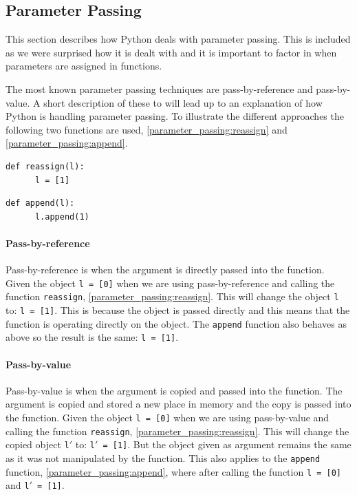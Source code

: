 \subsection{Parameter Passing}
This section describes how Python deals with parameter passing.
This is included as we were surprised how it is dealt with and it is important to factor in when parameters are assigned in functions.

The most known parameter passing techniques are pass-by-reference and pass-by-value.
A short description of these to will lead up to an explanation of how Python is handling parameter passing.
To illustrate the different approaches the following two functions are used, \cref{parameter_passing:reassign} and \cref{parameter_passing:append}.

\begin{lstlisting}[style=python, caption={Parameter passing: \texttt{reassign} function.}, label={parameter_passing:reassign}]
  def reassign(l):
      l = [1]
\end{lstlisting}

\begin{lstlisting}[style=python, caption={Parameter passing: \texttt{append} function.}, label={parameter_passing:append}]
  def append(l):
      l.append(1)
\end{lstlisting}

\paragraph{Pass-by-reference}
Pass-by-reference is when the argument is directly passed into the function.
Given the object \texttt{l = [0]} when we are using pass-by-reference and calling the function \texttt{reassign}, \cref{parameter_passing:reassign}.
This will change the object \texttt{l} to: \texttt{l = [1]}.
This is because the object is passed directly and this means that the function is operating directly on the object.
The \texttt{append} function also behaves as above so the result is the same: \texttt{l = [1]}.

\paragraph{Pass-by-value}
Pass-by-value is when the argument is copied and passed into the function.
The argument is copied and stored a new place in memory and the copy is passed into the function.
Given the object \texttt{l = [0]} when we are using pass-by-value and calling the function \texttt{reassign}, \cref{parameter_passing:reassign}.
This will change the copied object \texttt{l$'$} to: \texttt{l$'$ = [1]}.
But the object given as argument remains the same as it was not manipulated by the function.
This also applies to the \texttt{append} function, \cref{parameter_passing:append}, where after calling the function \texttt{l = [0]} and \texttt{l$'$ = [1]}.

